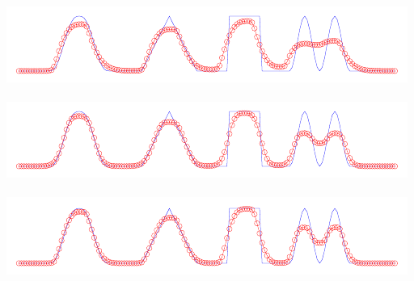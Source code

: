 \documentclass[ucs]{beamer}
\begin{document}
\begin{frame}
\begin{columns}
		\includegraphics[width=\textwidth]{conver/vanalbada}\\
		\\
		\includegraphics[width=\textwidth]{conver/vanleer}\\
		\\
		\includegraphics[width=\textwidth]{conver/koren}\\
	\end{columns}
\end{frame}
\end{document}

